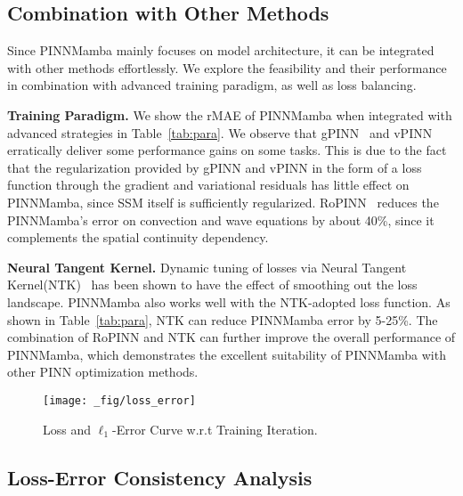 \subsection{Combination with Other Methods}
\vspace{-1mm}
Since PINNMamba mainly focuses on model architecture, it can be integrated with other methods effortlessly. 
    We explore the feasibility and their performance in combination with advanced training paradigm, as well as loss balancing.

\textbf{Training Paradigm.} We show the rMAE of PINNMamba when integrated with advanced strategies in Table~\ref{tab:para}. We observe that gPINN~\cite{yu2022gradient} and vPINN~\cite{kharazmi2019variational} erratically deliver some performance gains on some tasks. 
    This is due to the fact that the regularization provided by gPINN and vPINN in the form of a loss function through the gradient and variational residuals has little effect on PINNMamba, since SSM itself is sufficiently regularized. RoPINN~\cite{wu2024ropinn} reduces the PINNMamba's error on convection and wave equations by about 40\%, since it complements the spatial continuity dependency.

\textbf{Neural Tangent Kernel.} Dynamic tuning of losses via Neural Tangent Kernel(NTK)~\cite{wang2022and} has been shown to have the effect of smoothing out the loss landscape. 
PINNMamba also works well with the NTK-adopted loss function. As shown in Table~\ref{tab:para}, NTK can reduce PINNMamba error by 5-25\%. 
The combination of RoPINN and NTK can further improve the overall performance of PINNMamba, which demonstrates the excellent suitability of PINNMamba with other PINN optimization methods.

\begin{figure}[t!]
    \centering
    \texttt{[image: \_fig/loss\_error]}
    \vspace{-4mm}
    \caption{Loss and $\ell_1$-Error Curve w.r.t Training Iteration.}
    \label{fig:losserror}
    \vspace{-4mm}
\end{figure}
\vspace{-2mm}
\subsection{Loss-Error Consistency Analysis}
\vspace{-1mm}

